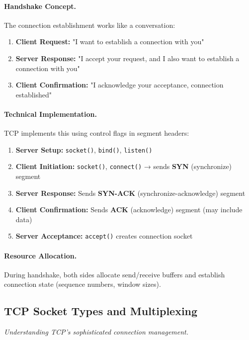 \documentclass[../../compsys.tex]{subfiles}
\begin{document}
\paragraph{Handshake Concept.} The connection establishment works like a conversation:
\begin{enumerate}
  \item \textbf{Client Request:} "I want to establish a connection with you"
  \item \textbf{Server Response:} "I accept your request, and I also want to establish a connection with you"
  \item \textbf{Client Confirmation:} "I acknowledge your acceptance, connection established"
\end{enumerate}

\paragraph{Technical Implementation.} TCP implements this using control flags in segment headers:

\begin{enumerate}
  \item \textbf{Server Setup:} \texttt{socket()}, \texttt{bind()}, \texttt{listen()}
  \item \textbf{Client Initiation:} \texttt{socket()}, \texttt{connect()} → sends \textbf{SYN} (synchronize) segment
  \item \textbf{Server Response:} Sends \textbf{SYN-ACK} (synchronize-acknowledge) segment
  \item \textbf{Client Confirmation:} Sends \textbf{ACK} (acknowledge) segment (may include data)
  \item \textbf{Server Acceptance:} \texttt{accept()} creates connection socket
\end{enumerate}

\paragraph{Resource Allocation.} During handshake, both sides allocate send/receive buffers and establish connection state (sequence numbers, window sizes).

\subsection{TCP Socket Types and Multiplexing}
\textit{Understanding TCP's sophisticated connection management.}
\end{document}
